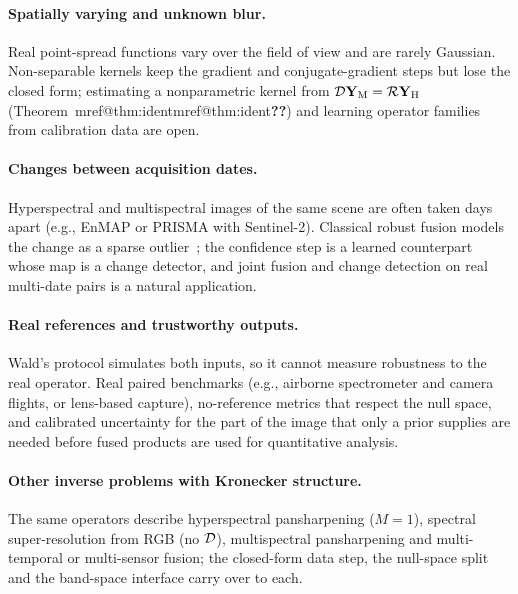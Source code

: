 \documentclass[10pt,twocolumn,letterpaper]{article}
\makeatletter
\newcommand{\mref}[1]{\ifcsname mref@#1\endcsname\csname mref@#1\endcsname\else\textbf{??}\fi}
\makeatother
\begin{document}
\paragraph{Spatially varying and unknown blur.} Real point-spread functions vary over the field of view and are rarely Gaussian. Non-separable kernels keep the gradient and conjugate-gradient steps but lose the closed form; estimating a nonparametric kernel from $\mathcal{D}\mathbf{Y}_{\mathrm{M}}=\mathcal{R}\mathbf{Y}_{\mathrm{H}}$ (Theorem~\mref{thm:ident}) and learning operator families from calibration data are open.

\paragraph{Changes between acquisition dates.} Hyperspectral and multispectral images of the same scene are often taken days apart (e.g., EnMAP or PRISMA with Sentinel-2). Classical robust fusion models the change as a sparse outlier~\cite{ferraris2017robust}; the confidence step is a learned counterpart whose map is a change detector, and joint fusion and change detection on real multi-date pairs is a natural application.

\paragraph{Real references and trustworthy outputs.} Wald's protocol simulates both inputs, so it cannot measure robustness to the real operator. Real paired benchmarks (e.g., airborne spectrometer and camera flights, or lens-based capture), no-reference metrics that respect the null space, and calibrated uncertainty for the part of the image that only a prior supplies are needed before fused products are used for quantitative analysis.

\paragraph{Other inverse problems with Kronecker structure.} The same operators describe hyperspectral pansharpening ($M=1$), spectral super-resolution from RGB (no $\mathcal{D}$), multispectral pansharpening and multi-temporal or multi-sensor fusion; the closed-form data step, the null-space split and the band-space interface carry over to each.

{
    \small
    
    
}
\end{document}
